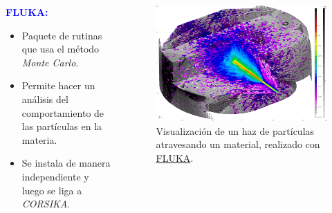     \begin{frame}{} %
        \justifying %
        \vspace*{-0.1cm} %

        \begin{columns}
            \begin{column}{0.5\textwidth} %
                \textcolor{blue}{\textbf{FLUKA:}}
                \begin{itemize}
                    \item Paquete de rutinas que usa el método \emph{Monte Carlo}.
                    \item Permite hacer un análisis del comportamiento de las partículas en la materia.
                    \item Se instala de manera independiente y luego se liga a \emph{CORSIKA}.
                \end{itemize}
            \end{column}

            \begin{column}{0.4\textwidth} %
                \begin{figure}
                    \includegraphics[width=1.1\textwidth]{Figures/fluka.png}
                    \caption{\tiny Visualización de un haz de partículas atravesando un material, realizado con \href{https://fluka.cern/documentation/running/flair-gui}{FLUKA}.}  
                \end{figure}              
            \end{column}
        \end{columns}
    \end{frame}  

